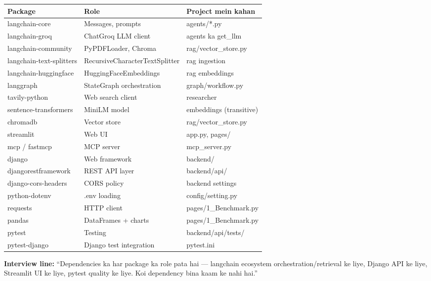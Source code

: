 \begin{longtable}{p{4.2cm} p{5.4cm} p{4.8cm}}
\toprule
\textbf{Package} & \textbf{Role} & \textbf{Project mein kahan} \\
\midrule
langchain-core & Messages, prompts & agents/*.py \\
langchain-groq & ChatGroq LLM client & agents ka get\_llm \\
langchain-community & PyPDFLoader, Chroma & rag/vector\_store.py \\
langchain-text-splitters & RecursiveCharacterTextSplitter & rag ingestion \\
langchain-huggingface & HuggingFaceEmbeddings & rag embeddings \\
langgraph & StateGraph orchestration & graph/workflow.py \\
tavily-python & Web search client & researcher \\
sentence-transformers & MiniLM model & embeddings (transitive) \\
chromadb & Vector store & rag/vector\_store.py \\
streamlit & Web UI & app.py, pages/ \\
mcp / fastmcp & MCP server & mcp\_server.py \\
django & Web framework & backend/ \\
djangorestframework & REST API layer & backend/api/ \\
django-cors-headers & CORS policy & backend settings \\
python-dotenv & .env loading & config/setting.py \\
requests & HTTP client & pages/1\_Benchmark.py \\
pandas & DataFrames + charts & pages/1\_Benchmark.py \\
pytest & Testing & backend/api/tests/ \\
pytest-django & Django test integration & pytest.ini \\
\bottomrule
\end{longtable}

\begin{memorybox}
\textbf{Interview line:} ``Dependencies ka har package ka role pata hai --- langchain ecosystem orchestration/retrieval ke liye, Django API ke liye, Streamlit UI ke liye, pytest quality ke liye. Koi dependency bina kaam ke nahi hai.''
\end{memorybox}

